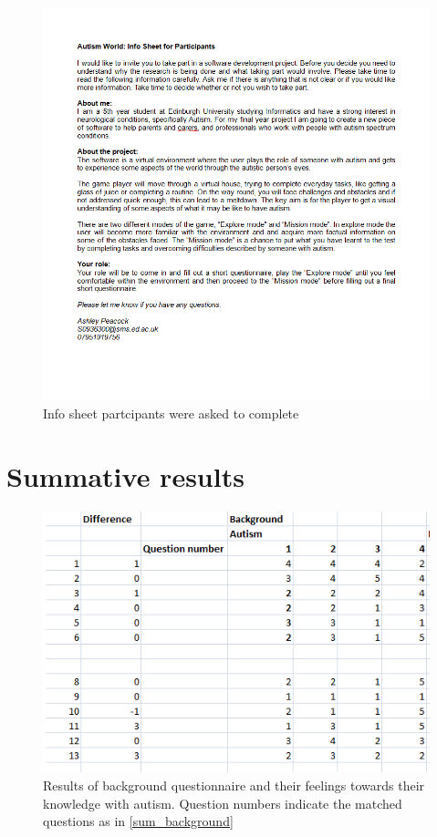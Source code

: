 \begin{figure}[H]
\centering
\includegraphics[scale=0.7]{images/appendix/summative_infosheet.png}
\caption{Info sheet partcipants were asked to complete}
\end{figure}

\section{Summative results}
\label{summative_backgroundresults}

\begin{figure}[H]
\centering
\includegraphics[scale=0.7]{images/appendix/summative_resultsbackground.png}
\caption{Results of background questionnaire and their feelings towards their knowledge with autism. Question numbers indicate the matched questions as in \ref{sum_background}}
\end{figure}

